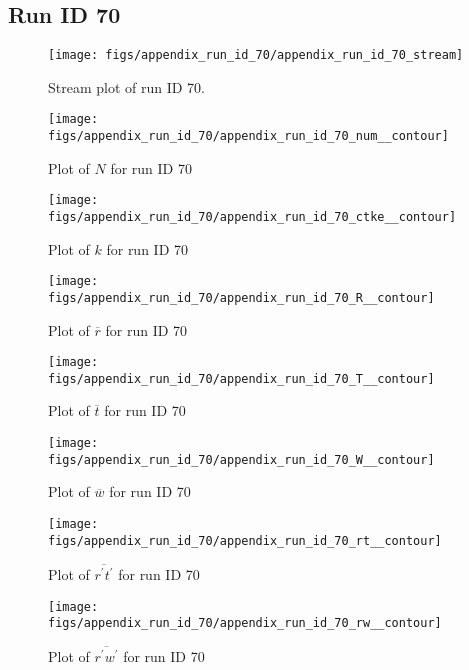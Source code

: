 \subsection{Run ID 70}
\begin{figure}[H]
\centering
\texttt{[image: figs/appendix\_run\_id\_70/appendix\_run\_id\_70\_stream]}
\caption{Stream plot of run ID 70.}
\label{fig:appendix_run_id_70_stream}
\end{figure}


\begin{figure}[H]
\centering
\texttt{[image: figs/appendix\_run\_id\_70/appendix\_run\_id\_70\_num\_\_contour]}
\caption{Plot of $N$ for run ID 70}
\label{fig:appendix_run_id_70_num__contour}
\end{figure}


\begin{figure}[H]
\centering
\texttt{[image: figs/appendix\_run\_id\_70/appendix\_run\_id\_70\_ctke\_\_contour]}
\caption{Plot of $k$ for run ID 70}
\label{fig:appendix_run_id_70_ctke__contour}
\end{figure}


\begin{figure}[H]
\centering
\texttt{[image: figs/appendix\_run\_id\_70/appendix\_run\_id\_70\_R\_\_contour]}
\caption{Plot of $\overline{r}$ for run ID 70}
\label{fig:appendix_run_id_70_R__contour}
\end{figure}


\begin{figure}[H]
\centering
\texttt{[image: figs/appendix\_run\_id\_70/appendix\_run\_id\_70\_T\_\_contour]}
\caption{Plot of $\overline{t}$ for run ID 70}
\label{fig:appendix_run_id_70_T__contour}
\end{figure}


\begin{figure}[H]
\centering
\texttt{[image: figs/appendix\_run\_id\_70/appendix\_run\_id\_70\_W\_\_contour]}
\caption{Plot of $\overline{w}$ for run ID 70}
\label{fig:appendix_run_id_70_W__contour}
\end{figure}


\begin{figure}[H]
\centering
\texttt{[image: figs/appendix\_run\_id\_70/appendix\_run\_id\_70\_rt\_\_contour]}
\caption{Plot of $\overline{r^\prime t^\prime}$ for run ID 70}
\label{fig:appendix_run_id_70_rt__contour}
\end{figure}


\begin{figure}[H]
\centering
\texttt{[image: figs/appendix\_run\_id\_70/appendix\_run\_id\_70\_rw\_\_contour]}
\caption{Plot of $\overline{r^\prime w^\prime}$ for run ID 70}
\label{fig:appendix_run_id_70_rw__contour}
\end{figure}


